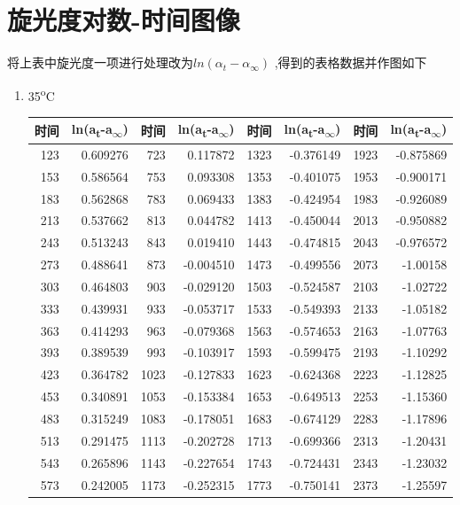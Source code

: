 \documentclass[11pt]{report}
\begin{document}
\section{旋光度对数-时间图像}
\label{sec:org1611138}
将上表中旋光度一项进行处理改为\(ln(\alpha_{t}-\alpha_{\infty})\) ,得到的表格数据并作图如下
\begin{enumerate}
\item 35\textsuperscript{o}C
\label{sec:org87468fc}
\begin{center}
\begin{tabular}{rrrrrrrr}
时间 & ln(a\textsubscript{t}-a\textsubscript{\(\infty\)}) & 时间 & ln(a\textsubscript{t}-a\textsubscript{\(\infty\)}) & 时间 & ln(a\textsubscript{t}-a\textsubscript{\(\infty\)}) & 时间 & ln(a\textsubscript{t}-a\textsubscript{\(\infty\)})\\
\hline
123 & 0.609276 & 723 & 0.117872 & 1323 & -0.376149 & 1923 & -0.875869\\
153 & 0.586564 & 753 & 0.093308 & 1353 & -0.401075 & 1953 & -0.900171\\
183 & 0.562868 & 783 & 0.069433 & 1383 & -0.424954 & 1983 & -0.926089\\
213 & 0.537662 & 813 & 0.044782 & 1413 & -0.450044 & 2013 & -0.950882\\
243 & 0.513243 & 843 & 0.019410 & 1443 & -0.474815 & 2043 & -0.976572\\
273 & 0.488641 & 873 & -0.004510 & 1473 & -0.499556 & 2073 & -1.00158\\
303 & 0.464803 & 903 & -0.029120 & 1503 & -0.524587 & 2103 & -1.02722\\
333 & 0.439931 & 933 & -0.053717 & 1533 & -0.549393 & 2133 & -1.05182\\
363 & 0.414293 & 963 & -0.079368 & 1563 & -0.574653 & 2163 & -1.07763\\
393 & 0.389539 & 993 & -0.103917 & 1593 & -0.599475 & 2193 & -1.10292\\
423 & 0.364782 & 1023 & -0.127833 & 1623 & -0.624368 & 2223 & -1.12825\\
453 & 0.340891 & 1053 & -0.153384 & 1653 & -0.649513 & 2253 & -1.15360\\
483 & 0.315249 & 1083 & -0.178051 & 1683 & -0.674129 & 2283 & -1.17896\\
513 & 0.291475 & 1113 & -0.202728 & 1713 & -0.699366 & 2313 & -1.20431\\
543 & 0.265896 & 1143 & -0.227654 & 1743 & -0.724431 & 2343 & -1.23032\\
573 & 0.242005 & 1173 & -0.252315 & 1773 & -0.750141 & 2373 & -1.25597\\

\end{tabular}
\end{center}
\end{enumerate}
\end{document}
